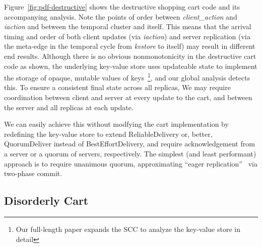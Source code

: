 Figure~\ref{fig:pdf-destructive} shows the destructive shopping cart code
and its accompanying analysis.  Note the points of order between \emph{client\_action} and \emph{iaction}
and between the temporal cluster and itself.  This means that the arrival 
timing and order of both client updates (via \emph{iaction}) and
server replication (via the meta-edge in the temporal cycle from 
\emph{kvstore} to itself) may result in different
end results.  Although there is no obvious nonmonotonicity in the destructive
cart code as shown, the underlying key-value store uses updateable state
to implement the storage of opaque, mutable values of 
keys~\footnote{Our full-length paper expands the SCC to analyze the
key-value store in detail}, 
and our global analysis detects this.
To ensure a consistent final state across all replicas, We may require coordination
between client and server at every update to the cart, and between the 
server and all replicas at each update.  

We can easily achieve this without modfying the cart implementation
by redefining the key-value store to extend
ReliableDelivery or, better, QuorumDeliver instead of BestEffortDelivery, and require acknowledgement from a server or a quorum of servers, respectively.
The simplest (and least performant) approach is to require unanimous quorum,
approximating ``eager replication''~\cite{dangers} via two-phase commit.


\subsection{Disorderly Cart}

